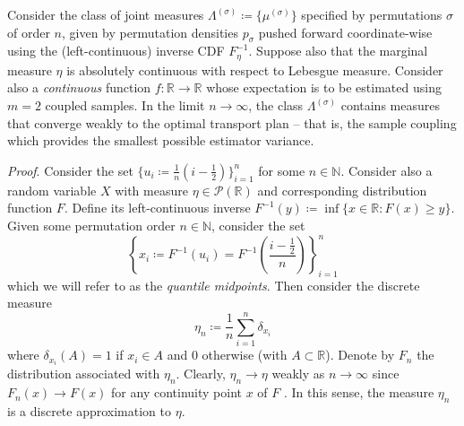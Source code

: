 \begin{theorem} \label{thm:optimality_app}
 Consider the class of joint measures $\Lambda^{(\sigma)} \coloneqq \{\mu^{(\sigma)}\}$ specified by permutations $\sigma$ of order $n$, given by permutation densities $p_\sigma$ pushed forward coordinate-wise using the (left-continuous) inverse CDF $F_\eta^{-1}$.
 Suppose also that the marginal measure $\eta$ is absolutely continuous with respect to Lebesgue measure. 
Consider also a \emph{continuous} function $f:\mathbb{R} \to \mathbb{R}$ whose expectation is to be estimated using $m=2$ coupled samples. 
In the limit $n\to \infty$, the class $\Lambda^{(\sigma)}$ contains measures that converge weakly to the optimal transport plan -- that is, the sample coupling which provides the smallest possible estimator variance.
\end{theorem}

\emph{Proof}. Consider the set $\{u_i \coloneqq \frac{1}{n} \left ( i - \frac{1}{2} \right) \}_{i=1}^n$ for some $n \in \mathbb{N}$. 
Consider also a random variable $X$ with measure $\eta \in \mathcal{P}(\mathbb{R})$ and corresponding distribution function $F$. 
Define its left-continuous inverse $F^{-1}(y) \coloneqq \inf \{x \in \mathbb{R}: F(x) \geq y \}$.
Given some permutation order $n \in \mathbb{N}$, consider the set  
\begin{equation}
    \left \{ x_i \coloneqq F^{-1}\left(u_i\right) = F^{-1}\left(\frac{i-\frac{1}{2}}{n}\right)  \right \}_{i=1}^n 
\end{equation}
which we will refer to as the \emph{quantile midpoints}. Then consider the discrete measure
\begin{equation}
\eta_n \coloneqq \frac{1}{n} \sum_{i=1}^n \delta_{x_i}
\end{equation}
where $\delta_{x_i}(A)=1$ if $x_i \in A$ and $0$ otherwise (with $A \subset \mathbb{R}$). 
Denote by $F_n$ the distribution associated with $\eta_n$.
Clearly, $\eta_n \to \eta$ weakly as $n \to \infty$ since $F_n(x) \to F(x)$ for any continuity point $x$ of $F$ \citep{billingsley2013convergence}. 
In this sense, the measure $\eta_n$ is a discrete approximation to $\eta$. 

